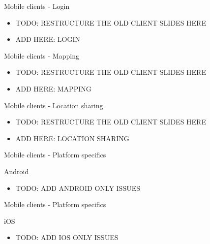 \documentclass[11pt]{beamer}
\begin{document}
\begin{frame}{Mobile clients - Login}

  \begin{itemize}

    \item TODO: RESTRUCTURE THE OLD CLIENT SLIDES HERE
    \item ADD HERE: LOGIN

  \end{itemize}

\end{frame}


\begin{frame}{Mobile clients - Mapping}

  \begin{itemize}

    \item TODO: RESTRUCTURE THE OLD CLIENT SLIDES HERE
    \item ADD HERE: MAPPING

  \end{itemize}

\end{frame}


\begin{frame}{Mobile clients - Location sharing}

  \begin{itemize}

    \item TODO: RESTRUCTURE THE OLD CLIENT SLIDES HERE
    \item ADD HERE: LOCATION SHARING

  \end{itemize}

\end{frame}


\begin{frame}{Mobile clients - Platform specifics}

  Android

  \begin{itemize}

    \item TODO: ADD ANDROID ONLY ISSUES

  \end{itemize}

\end{frame}


\begin{frame}{Mobile clients - Platform specifics}

  iOS

  \begin{itemize}

    \item TODO: ADD IOS ONLY ISSUES

  \end{itemize}

\end{frame}
\end{document}

